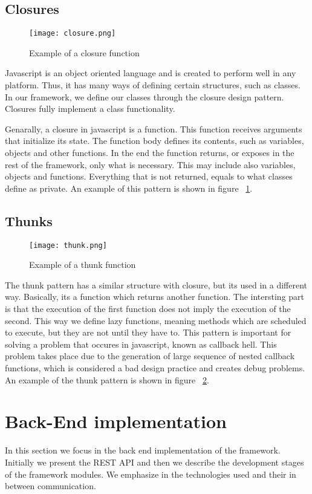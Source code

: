 \subsection{Closures}
\begin{figure}
	\centerline{\texttt{[image: closure.png]}}
	\caption{Example of a closure function}
	\label{closure}
\end{figure} 
Javascript is an object oriented language and is created to perform well in any platform. Thus, it has many ways of defining certain structures, such as classes. In our framework, we define our classes through the closure design pattern. Closures fully implement a class functionality.\par
	Genarally, a closure in javascript is a function. This function receives arguments that initialize its state. The function body defines its contents, such as variables, objects and other functions. In the end the function returns, or exposes in the rest of the framework, only what is necessary. This may include also variables, objects and functions. Everything that is not returned, equals to what classes define as private. An example of this pattern is shown in figure ~\ref{closure}.

\subsection{Thunks}
\begin{figure}
	\centerline{\texttt{[image: thunk.png]}}
	\caption{Example of a thunk function}
	\label{thunk}
\end{figure} 
The thunk pattern has a similar structure with closure, but its used in a different way. Basically, its a function which returns another function. The intersting part is that the execution of the first function does not imply the execution of the second. This way we define lazy functions, meaning methods which are scheduled to execute, but they are not until they have to. This pattern is important for solving a problem that occures in javascript, known as callback hell. This problem takes place due to the generation of large sequence of nested callback functions, which is considered a bad design practice and creates debug problems. An example of the thunk pattern is shown in figure ~\ref{thunk}.

\section{Back-End implementation}
In this section we focus in the back end implementation of the framework. Initially we present the REST API and then we describe the development stages of the framework modules. We emphasize in the technologies used and their in between communication.

